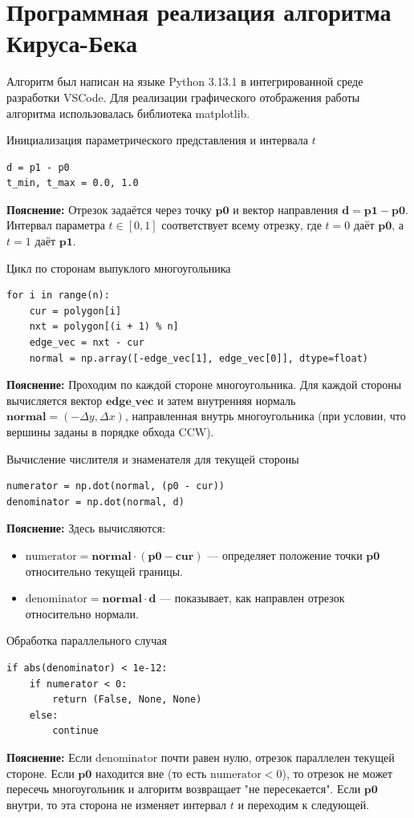 \documentclass[areasetadvanced]{scrartcl}
\begin{document}
\section{Программная реализация алгоритма Кируса-Бека}
Алгоритм был написан на языке Python 3.13.1 в интегрированной среде разработки VSCode. Для реализации графического отображения работы алгоритма использовалась библиотека matplotlib.

Инициализация параметрического представления и интервала \(t\)
\begin{lstlisting}
d = p1 - p0
t_min, t_max = 0.0, 1.0
\end{lstlisting}
\textbf{Пояснение:}  
Отрезок задаётся через точку \(\mathbf{p0}\) и вектор направления \(\mathbf{d} = \mathbf{p1} - \mathbf{p0}\). Интервал параметра \(t \in [0,1]\) соответствует всему отрезку, где \(t=0\) даёт \(\mathbf{p0}\), а \(t=1\) даёт \(\mathbf{p1}\).

Цикл по сторонам выпуклого многоугольника
\begin{lstlisting}
for i in range(n):
    cur = polygon[i]
    nxt = polygon[(i + 1) % n]
    edge_vec = nxt - cur
    normal = np.array([-edge_vec[1], edge_vec[0]], dtype=float)
\end{lstlisting}
\textbf{Пояснение:}  
Проходим по каждой стороне многоугольника. Для каждой стороны вычисляется вектор \(\mathbf{edge\_vec}\) и затем внутренняя нормаль \(\mathbf{normal} = (-\Delta y, \Delta x)\), направленная внутрь многоугольника (при условии, что вершины заданы в порядке обхода CCW).

Вычисление числителя и знаменателя для текущей стороны
\begin{lstlisting}
numerator = np.dot(normal, (p0 - cur))
denominator = np.dot(normal, d)
\end{lstlisting}
\textbf{Пояснение:}  
Здесь вычисляются:
\begin{itemize}
  \item \(\text{numerator} = \mathbf{normal} \cdot (\mathbf{p0} - \mathbf{cur})\) — определяет положение точки \(\mathbf{p0}\) относительно текущей границы.
  \item \(\text{denominator} = \mathbf{normal} \cdot \mathbf{d}\) — показывает, как направлен отрезок относительно нормали.
\end{itemize}

Обработка параллельного случая
\begin{lstlisting}
if abs(denominator) < 1e-12:
    if numerator < 0:
        return (False, None, None)
    else:
        continue
\end{lstlisting}
\textbf{Пояснение:}  
Если \(\text{denominator}\) почти равен нулю, отрезок параллелен текущей стороне. Если \(\mathbf{p0}\) находится вне (то есть \(\text{numerator} < 0\)), то отрезок не может пересечь многоугольник и алгоритм возвращает "не пересекается". Если \(\mathbf{p0}\) внутри, то эта сторона не изменяет интервал \(t\) и переходим к следующей.
\end{document}
